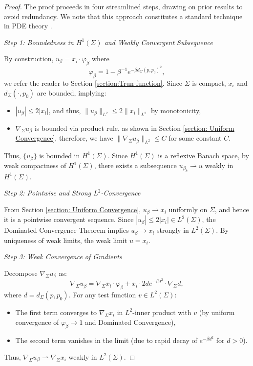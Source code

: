 \documentclass[a4, 12pt]{amsart}
\numberwithin{equation}{section} \numberwithin{equation}{section}
\begin{document}
\begin{proof}
The proof proceeds in four streamlined steps, drawing on prior results to avoid redundancy. We note that this approach constitutes a standard technique in PDE theory \cite{LH}.

\textit{Step 1: Boundedness in $H^1(\Sigma)$ and Weakly Convergent Subsequence}

By construction, $u_\beta = x_i \cdot \varphi_\beta$ where \begin{equation*}\varphi_\beta = 1-\beta^{-1}e^{-\beta d_\Sigma(p,p_0)^2},\end{equation*} we refer the reader to Section \ref{section:Trun function}. Since $\Sigma$ is compact, $x_i$ and $d_\Sigma(\cdot,p_0)$ are bounded, implying:
\begin{itemize}\item [(i)] $|u_\beta| \leq 2|x_i|$, and thus, $\|u_\beta\|_{L^2} \leq 2\|x_i\|_{L^2}$ by monotonicity,
\item[(ii)] $\nabla_\Sigma u_\beta$ is bounded via product rule, as shown in Section \ref{section: Uniform Convergence}, therefore, we have $\|\nabla_\Sigma u_\beta\|_{L^2} \leq C$ for some constant $C$.
\end{itemize}
Thus, $\{u_\beta\}$ is bounded in $H^1(\Sigma)$. Since $H^1(\Sigma)$ is a reflexive Banach space, by weak compactness of $H^1(\Sigma)$, there exists a subsequence $u_{\beta_k} \rightharpoonup u$ weakly in $H^1(\Sigma)$.


\textit{Step 2: Pointwise and Strong $L^2$-Convergence}

From Section \ref{section: Uniform Convergence}, $u_\beta \to x_i$ uniformly on $\Sigma$, and hence it is a pointwise convergent sequence. Since $|u_\beta| \leq 2|x_i| \in L^2(\Sigma)$, the Dominated Convergence Theorem implies $u_\beta \to x_i$ strongly in $L^2(\Sigma)$. By uniqueness of weak limits, the weak limit $u = x_i$.


\textit{Step 3: Weak Convergence of Gradients}

Decompose $\nabla_\Sigma u_\beta$ as:
\begin{equation*}
\nabla_\Sigma u_\beta = \nabla_\Sigma x_i \cdot \varphi_\beta + x_i \cdot 2d e^{-\beta d^2} \cdot \nabla_\Sigma d,
\end{equation*}
where $d = d_\Sigma(p,p_0)$. For any test function $v \in L^2(\Sigma)$:
\begin{itemize}\item[(i)]  The first term converges to $\nabla_\Sigma x_i$ in $L^2$-inner product with $v$ (by uniform convergence of $\varphi_\beta \to 1$ and Dominated Convergence),
\item[(ii)]  The second term vanishes in the limit (due to rapid decay of $e^{-\beta d^2}$ for $d > 0$).
\end{itemize}
Thus, $\nabla_\Sigma u_\beta \rightharpoonup \nabla_\Sigma x_i$ weakly in $L^2(\Sigma)$.



\end{proof}
\end{document}
